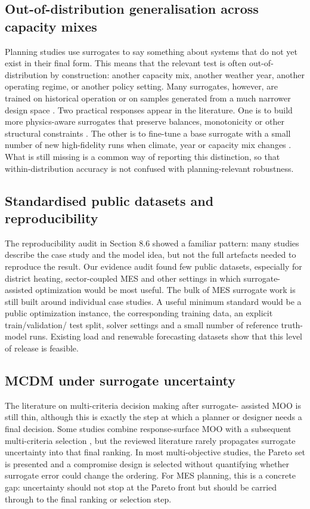 \subsection{Out-of-distribution generalisation across capacity mixes}
\label{sec:ch:ood}
Planning studies use surrogates to say something about systems that do
not yet exist in their final form. This means that the relevant test is
often out-of-distribution by construction: another capacity mix, another
weather year, another operating regime, or another policy setting. Many
surrogates, however, are trained on historical operation or on samples
generated from a much narrower design space
\cite{Park2019,Reynolds2017704,Subedi2026157,Khaloie2025,Lim2025,Mylonopoulos202332697}.
Two practical responses appear in the literature. One is to build more
physics-aware surrogates that preserve balances, monotonicity or other
structural constraints
\cite{Park2019,Su2022315,Liu20223726,Petrova2025,Du2025}. The other
is to fine-tune a base surrogate with a small number of new
high-fidelity runs when climate, year or capacity mix changes
\cite{Chen202514792,De Castro20247710}. What is
still missing is a common way of reporting this distinction, so that
within-distribution accuracy is not confused with planning-relevant
robustness.
\subsection{Standardised public datasets and reproducibility}
\label{sec:ch:data}
The reproducibility audit in Section 8.6 showed a familiar pattern:
many studies describe the case study and the model idea, but not the
full artefacts needed to reproduce the result. Our evidence audit found
few public datasets, especially for district heating, sector-coupled MES
and other settings in which surrogate-assisted optimization would be
most useful.
The bulk of MES surrogate work is still built around individual case
studies. A useful minimum standard would be a public optimization
instance, the corresponding training data, an explicit train/validation/
test split, solver settings and a small number of reference truth-model
runs. Existing load and renewable forecasting datasets
\cite{Eseye201991463,Faraji2020157284,Hanifi2024,Sideratos2020,Tian2020,Madhukumar20228891}
show that this level of release is feasible.
\subsection{MCDM under surrogate uncertainty}
\label{sec:ch:mcdm}
The literature on multi-criteria decision making after surrogate-
assisted MOO is still thin, although this is exactly the step at which a
planner or designer needs a final decision. Some studies combine
response-surface MOO with a subsequent multi-criteria selection
\cite{Roy2020}, but the reviewed literature rarely propagates surrogate
uncertainty into that final ranking. In most multi-objective studies,
the Pareto set is presented and a compromise design is selected without
quantifying whether surrogate error could change the ordering.
For MES planning, this is a concrete gap: uncertainty should not stop at
the Pareto front but should be carried through to the final ranking or
selection step.
